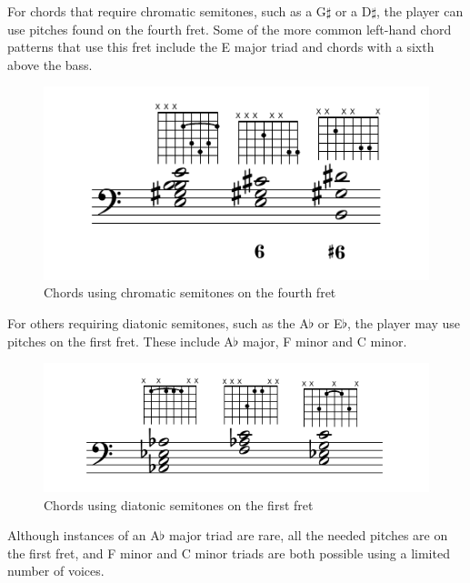 For chords that require chromatic semitones, such as a G$\sharp$ or a D$\sharp$, the
player can use pitches found on the fourth fret.  Some of the more common left-hand chord
patterns that use this fret include the E major triad and chords with a
sixth above the bass.
\begin{figure}[h]
\centering
\includegraphics{examples/g-sharp.pdf}
\caption{Chords using chromatic semitones on the fourth fret}
\label{fourth-fret-chords}
\end{figure}
For others requiring diatonic semitones, such as the A$\flat$ or E$\flat$, the
player may use pitches on the first fret.  These include A$\flat$ major, F minor and C
minor.
\begin{figure}[h]
\centering
\includegraphics{examples/a-flat.pdf}
\caption{Chords using diatonic semitones on the first fret}
\label{first-fret-chords}
\end{figure}
Although instances of an A$\flat$ major triad are rare, all the needed pitches are on
the first fret, and F minor and C minor triads are both possible using a limited
number of voices.

